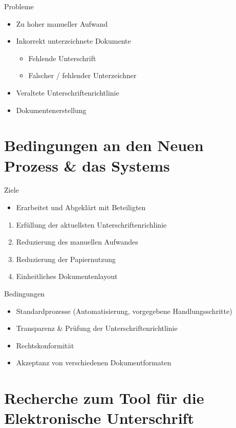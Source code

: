 \documentclass[utf8, xcolor, usenames,dvipsnames, aspectratio=169, notes, ]{beamer}
\begin{document}
\begin{frame}{Probleme}
	\begin{itemize}
		\item Zu hoher manueller Aufwand	
		\item Inkorrekt unterzeichnete Dokumente 
		\begin{itemize}
			\item Fehlende Unterschrift
			\item Falscher / fehlender Unterzeichner
		\end{itemize}
		\item Veraltete Unterschriftenrichtlinie
		\item Dokumentenerstellung
	\end{itemize}
\end{frame}

\section{Bedingungen an den Neuen Prozess \& das Systems}
\begin{frame}{Ziele}
	\begin{itemize}
		\item Erarbeitet und Abgeklärt mit Beteiligten
	\end{itemize}
	\begin{enumerate}
		\item Erfüllung der aktuellsten Unterschriftenrichlinie
		\item Reduzierung des manuellen Aufwandes
		\item Reduzierung der Papiernutzung
		\item Einheitliches Dokumentenlayout
	\end{enumerate}
\end{frame}

\begin{frame}{Bedingungen}
	\begin{itemize}
		\item Standardprozesse (Automatisierung, vorgegebene Handlungsschritte)
		\item Transparenz \& Prüfung der Unterschriftenrichtlinie
		\item Rechtskonformität
		\item Akzeptanz von verschiedenen Dokumentformaten
	\end{itemize}
\end{frame}

\section{Recherche zum Tool für die Elektronische Unterschrift}
\end{document}
